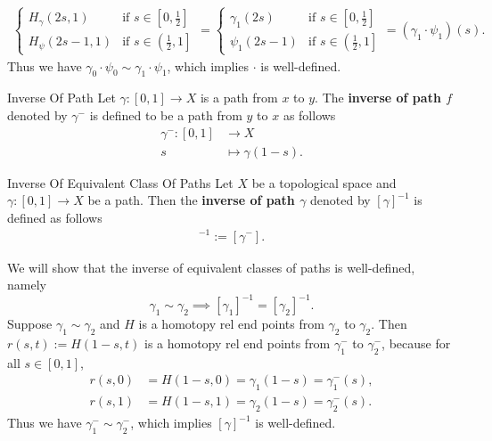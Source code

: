 \documentclass{report}
\begin{document}
\begin{prf}
\[\begin{aligned}
\begin{cases}
				                                               H_{\gamma}(2s, 1) & \text{if }s\in\left[0,\frac{1}{2}\right]              \\
				                                               H_{\psi}(2s-1, 1) & \text{if }s\in\left(\left.\frac{1}{2},1\right]\right.
			                                               \end{cases}=\begin{cases}
				                                                           \gamma_1(2s) & \text{if }s\in\left[0,\frac{1}{2}\right]              \\
				                                                           \psi_1(2s-1) & \text{if }s\in\left(\left.\frac{1}{2},1\right]\right.
			                                                           \end{cases}=\left(\gamma_1\cdot \psi_1\right)(s).
		\end{aligned}\]
	Thus we have $\gamma_0\cdot \psi_0\sim \gamma_1\cdot \psi_1$, which implies $\cdot$ is well-defined.
\end{prf}

\begin{definition}{Inverse Of Path}{}
	Let $\gamma: [0,1] \longrightarrow X$ is a path from $x$ to $y$. The \textbf{inverse of path $f$} denoted by $\gamma^{-}$ is defined to be a path from $y$ to $x$ as follows
	\begin{align*}
		\gamma^{-}:[0,1] & \longrightarrow X        \\
		s                & \longmapsto \gamma(1-s).
	\end{align*}
\end{definition}

\begin{definition}{Inverse Of Equivalent Class Of Paths}{}
	Let $X$ be a topological space and $\gamma:[0,1]\to X$ be a path. Then the \textbf{inverse of path $\gamma$} denoted by $[\gamma]^{-1}$ is defined as follows
	\begin{align*}
		[\gamma]^{-1}:=[\gamma^{-}].
	\end{align*}
\end{definition}

\begin{prf}
	We will show that the inverse of equivalent classes of paths is well-defined, namely
	\[
		\gamma_1\sim \gamma_2\implies [\gamma_1]^{-1} = [\gamma_2]^{-1}.
	\]
	Suppose $\gamma_1\sim \gamma_2$ and $H$ is a homotopy rel end points from $\gamma_2$ to $\gamma_2$. Then $r(s,t):=H(1-s, t)$
	is a homotopy rel end points from $\gamma_1^{-}$ to $\gamma_2^{-}$, because for all $s\in[0,1]$,
	\begin{align*}
		r(s,0) & =H(1-s,0)=\gamma_1(1-s)=\gamma_1^{-}(s), \\
		r(s,1) & =H(1-s,1)=\gamma_2(1-s)=\gamma_2^{-}(s).
	\end{align*}
	Thus we have $\gamma_1^{-}\sim \gamma_2^{-}$, which implies $[\gamma]^{-1}$ is well-defined.
\end{prf}
\end{document}
